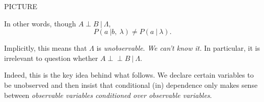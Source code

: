\documentclass[11pt, oneside]{article}   	%
\def\ci{\perp\!\!\!\perp}
\begin{document}
PICTURE

In other words, though $A \perp B \ | \ \Lambda$, \[ P(a \ | b,\ \lambda) \neq P(a \ | \ \lambda).\]

Implicitly, this means that $\Lambda$ is \emph{unobservable}. \emph{We can't know it.} In particular, it is irrelevant to question whether $A \ci B \ | \ \Lambda$.

Indeed, this is the key idea behind what follows. We declare certain variables to be unobserved and then insist that conditional (in)
dependence only makes sense between \emph{observable variables conditioned over observable variables}.


%
%
%
%
%
%
%
%
%
%
%
%
%
%
%
\end{document}
